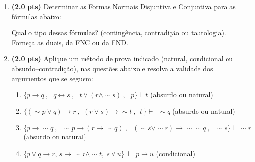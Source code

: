 \documentclass[11pt, a4paper,final]{article}
\begin{document}
\begin{enumerate}

\item {\bf (2.0 pts)} Determinar as Formas Normais Disjuntiva e Conjuntiva para as fórmulas abaixo:

Qual o tipo dessas fórmulas? (contingência, contradição ou tautologia). Forneça as duais, da FNC ou  da FND.


\item {\bf (2.0 pts)} Aplique um método de prova indicado (natural, condicional ou absurdo--contradição), nas questões abaixo e resolva a validade dos argumentos que se seguem: 

\begin{enumerate}
\item $\{p\rightarrow  q \: , \:\:\: q \leftrightarrow s \: , \:\:\:
 t \vee ( r \wedge \sim s)\: , \:\:\: p \} \vdash  t $ \hskip 1cm (absurdo ou natural)
 
\item  $\{ ( \sim p \vee q) \rightarrow r \: ,
  \:\: (r \vee s)  \rightarrow \sim t \: ,
    \:\: t \:   \} \vdash \: \:  \sim  q $ \hskip 1cm (absurdo ou natural)

\item $\{p\rightarrow \sim q \: , \:\:\: \sim p \rightarrow (r \rightarrow \sim q)  \: , \:\:\: (\sim s \vee \sim r)\rightarrow \sim \sim q  \: , \:\:\: \sim s  \} \vdash  \sim r $ \hskip 1cm (absurdo ou natural)

\item $ \{ p \vee q \rightarrow r,~ s \rightarrow \sim r \wedge \sim t,~ s \vee u \} ~\vdash~ p \rightarrow u $ \hskip 1cm (condicional)
\end{enumerate}

\begin{comment}
\begin{enumerate}


\end{comment}
\end{enumerate}
\end{document}
